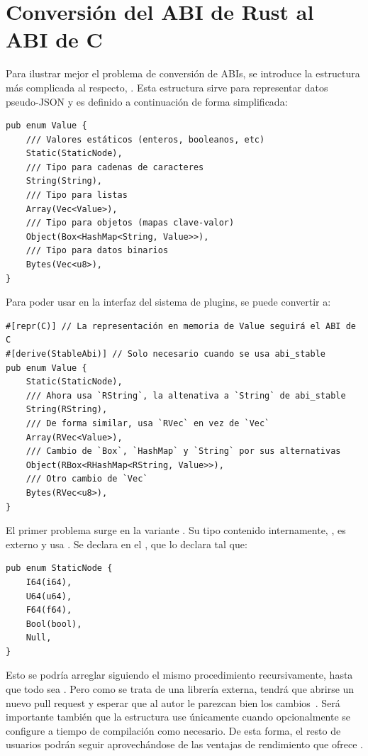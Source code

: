 \chapter{Conversión del ABI de Rust al ABI de C}\label{annex:abi}

Para ilustrar mejor el problema de conversión de ABIs, se introduce la
estructura más complicada al respecto, . Esta estructura sirve para
representar datos pseudo-JSON y es definido a continuación de forma
simplificada:

\begin{verbatim}
pub enum Value {
    /// Valores estáticos (enteros, booleanos, etc)
    Static(StaticNode),
    /// Tipo para cadenas de caracteres
    String(String),
    /// Tipo para listas
    Array(Vec<Value>),
    /// Tipo para objetos (mapas clave-valor)
    Object(Box<HashMap<String, Value>>),
    /// Tipo para datos binarios
    Bytes(Vec<u8>),
}
\end{verbatim}

Para poder usar  en la interfaz del sistema de plugins, se puede
convertir a:

\begin{verbatim}
#[repr(C)] // La representación en memoria de Value seguirá el ABI de C
#[derive(StableAbi)] // Solo necesario cuando se usa abi_stable
pub enum Value {
    Static(StaticNode),
    /// Ahora usa `RString`, la altenativa a `String` de abi_stable
    String(RString),
    /// De forma similar, usa `RVec` en vez de `Vec`
    Array(RVec<Value>),
    /// Cambio de `Box`, `HashMap` y `String` por sus alternativas
    Object(RBox<RHashMap<RString, Value>>),
    /// Otro cambio de `Vec`
    Bytes(RVec<u8>),
}
\end{verbatim}

El primer problema surge en la variante . Su tipo contenido
internamente, , es externo y usa . Se
declara en el \crate {}, que lo declara tal que:

\begin{verbatim}
pub enum StaticNode {
    I64(i64),
    U64(u64),
    F64(f64),
    Bool(bool),
    Null,
}
\end{verbatim}

Esto se podría arreglar siguiendo el mismo procedimiento recursivamente, hasta
que todo sea \rust{#[repr(C)]}. Pero como se trata de una librería externa,
tendrá que abrirse un nuevo pull request y esperar que al autor le parezcan bien
los cambios~\cite{openstaticnode}. Será importante también que la estructura use
\rust{#[repr(C)]} únicamente cuando opcionalmente se configure a tiempo de
compilación como necesario. De esta forma, el resto de usuarios podrán seguir
aprovechándose de las ventajas de rendimiento que ofrece .

